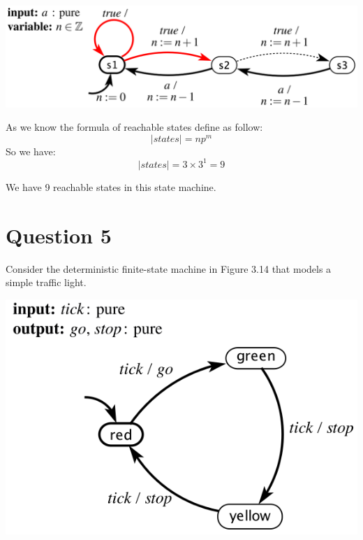 \documentclass[12pt]{article}
\begin{document}
\centering\includegraphics*[width=0.8\linewidth]{images/img2}


\begin{qsolve}[Solution]
	As we know the formula of reachable states define as follow:
	$$ |states|=np^m $$
	So we have:
	$$ |states|=3\times3^1=9 $$
	
	We have 9 reachable states in this state machine.
	
\end{qsolve}
\vfil
\clearpage

















\section{Question 5}
Consider the deterministic finite-state machine in Figure 3.14 that models a simple
traffic light.\newline


\centering\includegraphics*[width=0.6\linewidth]{images/img3}
\end{document}
